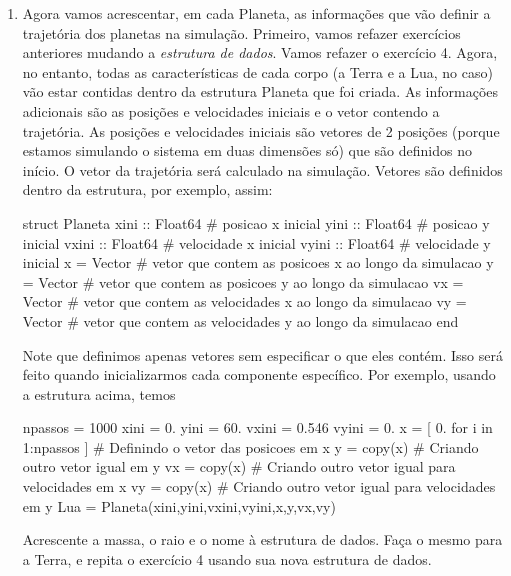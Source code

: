 \documentclass[10pt,a4paper,ssfamily]{exam}
\begin{document}
\begin{enumerate}
\item
Agora vamos acrescentar, em cada Planeta, as informações que vão definir
a trajetória dos planetas na simulação. Primeiro, vamos refazer
exercícios anteriores mudando a {\it estrutura de dados}. Vamos refazer
o exercício 4. Agora, no entanto, todas as características de cada corpo
(a Terra e a Lua, no caso) vão estar contidas dentro da estrutura
Planeta que foi criada. As informações adicionais são as posições e
velocidades iniciais e o vetor contendo a trajetória. As posições e
velocidades iniciais são vetores de 2 posições (porque estamos simulando
o sistema em duas dimensões só) que são definidos no início. O vetor da
trajetória será calculado na simulação. Vetores são definidos dentro da
estrutura, por exemplo, assim:
\begin{code}
struct Planeta
  xini :: Float64  # posicao x inicial
  yini :: Float64  # posicao y inicial
  vxini :: Float64 # velocidade x inicial
  vyini :: Float64 # velocidade y inicial
  x = Vector{}     # vetor que contem as posicoes x ao longo da simulacao
  y = Vector{}     # vetor que contem as posicoes y ao longo da simulacao 
  vx = Vector{}    # vetor que contem as velocidades x ao longo da simulacao  
  vy = Vector{}    # vetor que contem as velocidades y ao longo da simulacao   
end
\end{code}
Note que definimos apenas vetores sem especificar o que eles contém.
Isso será feito quando inicializarmos cada componente específico. Por
exemplo, usando a estrutura acima, temos 
\begin{code}
npassos = 1000
xini = 0. 
yini = 60.
vxini = 0.546 
vyini = 0.
x = [ 0. for i in 1:npassos ] # Definindo o vetor das posicoes em x
y = copy(x) # Criando outro vetor igual em y
vx = copy(x) # Criando outro vetor igual para velocidades em x
vy = copy(x) # Criando outro vetor igual para velocidades em y
Lua = Planeta(xini,yini,vxini,vyini,x,y,vx,vy)
\end{code}
Acrescente a massa, o raio e o nome à estrutura de dados. 
Faça o mesmo para a Terra, e repita o exercício 4 usando sua nova
estrutura de dados.

\end{enumerate}
\end{document}
